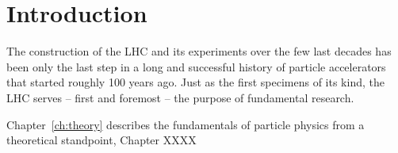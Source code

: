 \newcommand{\package}{\emph}

\chapter{Introduction}

The construction of the LHC and its experiments over the few last decades has been only
the last step in a long and successful history of particle accelerators that started roughly 100 years
ago. Just as the first specimens of its kind, the LHC serves -- first and foremost -- 
the purpose of fundamental research. 


Chapter~\ref{ch:theory} describes the fundamentals of particle physics from a theoretical standpoint,
Chapter XXXX






